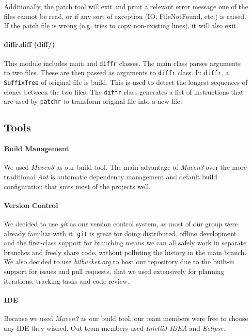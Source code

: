Additionally, the patch tool will exit and print a relevant error message one of the files cannot be read, or if any sort of exception (IO, FileNotFound, etc.) is raised. If the patch file is wrong (e.g. tries to copy non-existing lines), it will also exit.

\paragraph{diffr.diff (diff/)}

This module includes main and \texttt{diffr} classes. The main class parses arguments to two files. These are then passed as arguments to \texttt{diffr} class. In \texttt{diffr}, a \texttt{SuffixTree} of original file is build. This is used to detect the longest sequences of clones between the two files. The \texttt{diffr} class generates a list of instructions that are used by \texttt{patchr}  to transform original file into a new file.

\subsection{Tools}

\paragraph{Build Management}

We used \textit{Maven3} as our build tool. The main advantage of \textit{Maven3} over the more traditional \textit{Ant} is automatic dependency management and default build configuration that suits most of the projects well.

\paragraph{Version Control}
We decided to use \textit{git} as our version control system, as most of our group were already familiar with it. \texttt{git} is great for doing distributed, offline development and the first-class support for branching means we can all safely work in separate branches and freely share code, without polluting the history in the main branch. We also decided to use \textit{bitbucket.org} to host our repository due to the built-in support for issues and pull requests, that we used extensively for planning iterations, tracking tasks and code review.

\paragraph{IDE}
Because we used \textit{Maven3} as our build tool, our team members were free to choose any IDE they wished. Out team members used \textit{IntelliJ IDEA} and \textit{Eclipse}.

